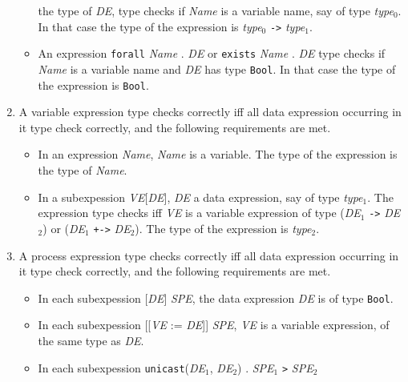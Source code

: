 \documentclass[adraft]{eptcs}
\newcommand{\aac}[1]{{\tt #1}}    %
\begin{document}
\begin{enumerate}
\begin{itemize}
    the type of \textit{DE}, type checks if \textit{Name} is a variable name, say of type
    \textit{type}$_0$. 
    In that case the type of the expression is \textit{type}$_0$ {\tt ->} \textit{type}$_1$.
  \item An expression \aac{forall} \textit{Name} . \textit{DE} or \aac{exists} \textit{Name} . \textit{DE}
    type checks if \textit{Name} is a variable name and  \textit{DE} has type {\tt Bool}.
    In that case the type of the expression is \aac{Bool}.
  \end{itemize}
\item A variable expression type checks correctly iff all data expression occurring in it type check
  correctly, and the following requirements are met.
  \begin{itemize}
  \item In an expression \textit{Name},  \textit{Name} is a variable. The type of the expression is
    the type of \textit{Name}.
  \item In a subexpession \textit{VE}[\textit{DE}],
    \textit{DE} a data expression, say of type \textit{type}$_1$. The expression type checks iff
    \textit{VE} is a variable expression of type
     (\textit{DE}$_1$ {\tt ->} \textit{DE}$_2$) or (\textit{DE}$_1$ {\tt +->} \textit{DE}$_2$).
    The type of the expression is \textit{type}$_2$.
  \end{itemize}
\item A process expression type checks correctly iff all data expression occurring in it type check
  correctly, and the following requirements are met.
  \begin{itemize}
  \item In each subexpession [\textit{DE}] \textit{SPE}, the data expression \textit{DE} is of type \aac{Bool}.
  \item In each subexpession [[\textit{VE} := \textit{DE}]] \textit{SPE}, \textit{VE} is a
    variable expression, of the same type as \textit{DE}.
  \item In each subexpession \aac{unicast}(\textit{DE}$_1$, \textit{DE}$_2$) . \textit{SPE}$_1$ {\tt >} \textit{SPE}$_2$

\end{itemize}
\end{enumerate}
\end{document}
